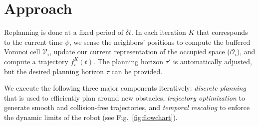 \documentclass{svproc}
\newcommand{\cV}{\mathcal{V}}
\newcommand{\cO}{\mathcal{O}}
\begin{document}

\section{Approach}


Replanning is done at a fixed period of $\delta t$.
In each iteration $K$ that corresponds to the current time $\psi$, we sense the neighbors' positions to compute the buffered Voronoi cell $\cV_i$, update our current representation of the occupied space ($\cO_i$), and compute a trajectory $f^K_i(t)$.
The planning horizon $\tau'$ is automatically adjusted, but the desired planning horizon $\tau$ can be provided.



We execute the following three major components iteratively: \emph{discrete planning} that is used to efficiently plan around new obstacles, \emph{trajectory optimization} to generate smooth and collision-free trajectories, and \emph{temporal rescaling} to enforce the dynamic limits of the robot (see Fig.~\ref{fig:flowchart}).


\end{document}
